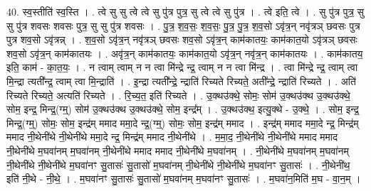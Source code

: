 \documentclass[17pt]{extarticle}
\begin{document}
40. स्व॒स्तीति॑ स्व॒स्ति । . त्वे सु सु त्वे त्वे सु पु॑त्र पुत्र॒ सु त्वे त्वे सु पु॑त्र । . त्वे इति॒ त्वे । . सु पु॑त्र पुत्र॒ सु सु पु॑त्र शवसः शवसः पुत्र॒ सु सु पु॑त्र शवसः । . पु॒त्र॒ श॒व॒सः॒ श॒व॒सः॒ पु॒त्र॒ पु॒त्र॒ श॒व॒सो ऽवृ॑त्र॒न् नवृ॑त्रञ् छवसः पुत्र पुत्र शव॒सो ऽवृ॑त्रन्न् । . श॒व॒सो ऽवृ॑त्र॒न् नवृ॑त्रञ् छवसः शव॒सो ऽवृ॑त्र॒न् काम॑कातयः॒ काम॑कात॒यो ऽवृ॑त्रञ् छवसः शव॒सो ऽवृ॑त्र॒न् काम॑कातयः । . अवृ॑त्र॒न् काम॑कातयः॒ काम॑कात॒यो ऽवृ॑त्र॒न् नवृ॑त्र॒न् काम॑कातयः । . काम॑कातय॒ इति॒ काम॑ - का॒त॒यः॒ । . न त्वाम् त्वाम् न न त्वा मि॑न्द्रे न्द्र॒ त्वाम् न न त्वा मि॑न्द्र । . त्वा मि॑न्द्रे न्द्र॒ त्वाम् त्वा मि॒न्द्रा त्यती᳚न्द्र॒ त्वाम् त्वा मि॒न्द्राति॑ । . इ॒न्द्रा त्यती᳚न्द्रे॒ न्द्राति॑ रिच्यते रिच्यते॒ अती᳚न्द्रे॒ न्द्राति॑ रिच्यते । . अति॑ रिच्यते रिच्यते॒ अत्यति॑ रिच्यते । . रि॒च्य॒त॒ इति॑ रिच्यते । . उ॒क्थ‍उ॑क्थे॒ सोमः॒ सोम॑ उ॒क्थ‍उ॑क्थ उ॒क्थ‍उ॑क्थे॒ सोम॒ इन्द्र॒ मिन्द्र॒(ग्म्॒) सोम॑ उ॒क्थ‍उ॑क्थ उ॒क्थ‍उ॑क्थे॒ सोम॒ इन्द्र᳚म् । . उ॒क्थ‌उ॑क्थ॒ इत्यु॒क्थे - उ॒क्थे॒ । . सोम॒ इन्द्र॒ मिन्द्र॒(ग्म्॒) सोमः॒ सोम॒ इन्द्र॑म् ममाद ममा॒दे न्द्र॒(ग्म्॒) सोमः॒ सोम॒ इन्द्र॑म् ममाद । . इन्द्र॑म् ममाद ममा॒दे न्द्र॒ मिन्द्र॑म् ममाद नी॒थेनी॑थे नी॒थेनी॑थे ममा॒दे न्द्र॒ मिन्द्र॑म् ममाद नी॒थेनी॑थे । . म॒मा॒द॒ नी॒थेनी॑थे नी॒थेनी॑थे ममाद ममाद नी॒थेनी॑थे म॒घवा॑नम् म॒घवा॑नम् नी॒थेनी॑थे ममाद ममाद नी॒थेनी॑थे म॒घवा॑नम् । . नी॒थेनी॑थे म॒घवा॑नम् म॒घवा॑नम् नी॒थेनी॑थे नी॒थेनी॑थे म॒घवा॑नꣳ सु॒तासः॑ सु॒तासो॑ म॒घवा॑नम् नी॒थेनी॑थे नी॒थेनी॑थे म॒घवा॑नꣳ सु॒तासः॑ । . नी॒थेनी॑थ॒ इति॑ नी॒थे - नी॒थे॒ । . म॒घवा॑नꣳ सु॒तासः॑ सु॒तासो॑ म॒घवा॑नम् म॒घवा॑नꣳ सु॒तासः॑ । . म॒घवा॑न॒मिति॑ म॒घ - वा॒न॒म् । \newline
\pagebreak
{}
\end{document}
